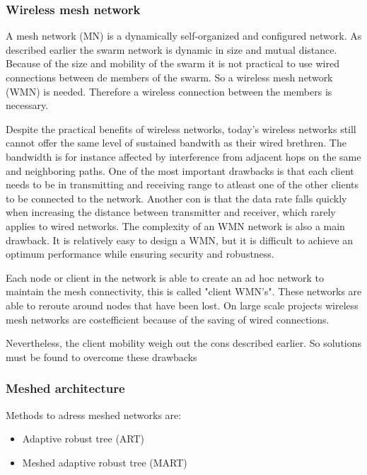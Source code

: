 \documentclass[10pt,a4paper]{article}
\begin{document}
\subsubsection{Wireless mesh network}
A mesh network (MN) is a dynamically self-organized and configured network. \cite{WMN1} As described earlier the swarm network is dynamic in size and mutual distance. Because of the size and mobility of the swarm it is not practical to use wired connections between de members of the swarm. So a wireless mesh network (WMN) is needed. Therefore a wireless connection between the members is necessary.

Despite the practical benefits of wireless networks, today's wireless networks still cannot offer the same level of sustained bandwith as their wired brethren. The bandwidth is for instance affected by interference from adjacent hops on the same and neighboring paths. \cite{architectureandalgorithmsmultichannelwirelessmeshnetwork} One of the most important drawbacks is that each client needs to be in transmitting and receiving range to atleast one of the other clients to be connected to the network. \cite{wirelessmeshnetworksopportunitiesandchallenges} Another con is that the data rate falls quickly when increasing the distance between transmitter and receiver, which rarely applies to wired networks. \cite{architectureandalgorithmsmultichannelwirelessmeshnetwork} The complexity of an WMN network is also a main drawback. It is relatively easy to design a WMN, but it is difficult to achieve an optimum performance while ensuring security and robustness.\cite{wirelessmeshnetworksopportunitiesandchallenges} 

Each node or client in the network is able to create an ad hoc network to maintain the mesh connectivity, this is called "client WMN's". These networks are able to reroute around nodes that have been lost. On large scale projects wireless mesh networks are costefficient because of the saving of wired connections.\cite{meshnetworking} 

Nevertheless, the client mobility weigh out the cons described earlier. So solutions must be found to overcome these drawbacks


\subsubsection{Meshed architecture}


Methods to adress meshed networks are:
\begin{itemize}
\setlength\itemsep{0em}
    \item Adaptive robust tree (ART)
    \item Meshed adaptive robust tree (MART)
\end{itemize}
\end{document}
